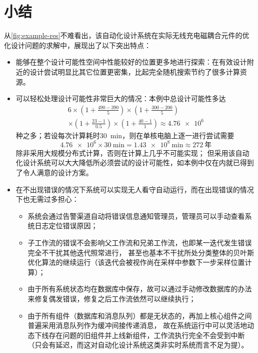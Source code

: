 \documentclass[index]{subfiles}
\begin{document}
\section{小结}
从\cref{fig:example-res}不难看出，该自动化设计系统在实际无线充电磁耦合元件的优化设计问题的求解中，展现出了以下突出特点：
\begin{itemize}
  \item 能够在整个设计可能性空间中性能较好的位置更多地进行探索：在有效设计附近的设计尝试明显比其它位置更密集，比起完全随机搜索节约了很多计算资源。
  \item 可以轻松处理设计可能性非常巨大的情况：本例中总设计可能性多达
  \[\begin{multlined}6\times\left(1+\frac{490-390}{5}\right)\times\left(1+\frac{300-200}{5}\right) \\
  \times\left(1+\frac{23-1}{0.5}\right)\times\left(1+\frac{40-1}{1}\right)\approx\num{4.76e6}\end{multlined}\]
  种之多；若设每次计算耗时\SI{30}{\minute}，则在单核电脑上逐一进行尝试需要
  \[\num{4.76e6}\times\SI{30}{\minute}=\SI{1.43e8}{\minute}\approx\num{272}\ \text{年}\]
  除非采用大规模分布式计算，否则在计算上几乎不可能实现；
  但采用该自动化设计系统可以大大降低所必须尝试的设计可能性，如本例中仅在\exmHour{}内就已得到了令人满意的设计方案。
  \item 在不出现错误的情况下系统可以实现无人看守自动运行，而在出现错误的情况下也无需过多担心：
  \begin{itemize}
    \item 系统会通过告警渠道自动将错误信息通知管理员，管理员可以手动查看系统日志定位错误原因；
    \item 子工作流的错误不会影响父工作流和兄弟工作流，也即某一迭代发生错误完全不干扰其他迭代照常进行，
    甚至也基本不干扰所处分类整体的贝叶斯优化算法的继续运行（该迭代会被视作尚在采样中参数下一步采样位置计算）；
    \item 由于所有系统状态均在数据库中保存，故可以通过手动修改数据库的办法来修复偶发错误，修复之后工作流依然可以继续执行；
    \item 由于所有组件（数据库和消息队列）都是无状态的，再加上核心组件之间普遍采用消息队列作为缓冲间接传递消息，
    故在系统运行中可以灵活地动态下线存在问题的旧组件并上线新组件，工作流执行完全不会受到中断（只会有延迟，而这对自动化设计系统这类非实时系统而言不足为提）。
  \end{itemize}
\end{itemize}
\end{document}
